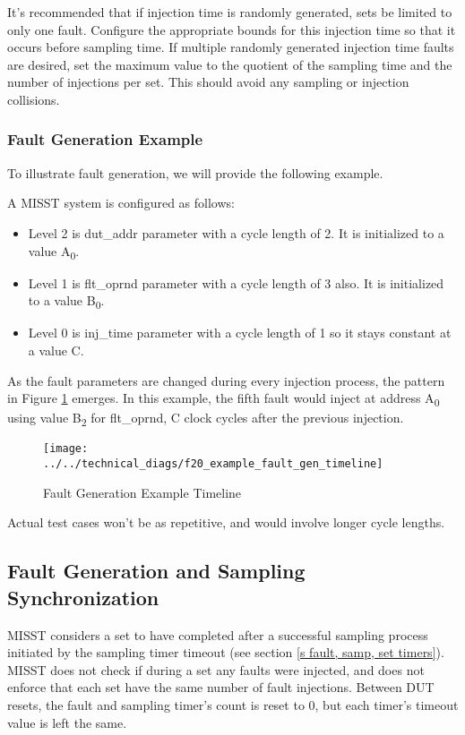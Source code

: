 \documentclass[]{report}
\begin{document}
It's recommended that if injection time is randomly generated, sets be limited to only one fault. Configure the appropriate bounds for this injection time so that it occurs before sampling time. If multiple randomly generated injection time faults are desired, set the maximum value to the quotient of the sampling time and the number of injections per set. This should avoid any sampling or injection collisions.

\subsubsection{Fault Generation Example}
\label{ss fault gen example}

To illustrate fault generation, we will provide the following example.

A MISST system is configured as follows:
\begin{itemize}
	\item Level 2 is dut\_addr parameter with a cycle length of 2. It is initialized to a value A\textsubscript{0}.
	\item Level 1 is flt\_oprnd parameter with a cycle length of 3 also. It is initialized to a value B\textsubscript{0}.
	\item Level 0 is inj\_time parameter with a cycle length of 1 so it stays constant at a value C.
\end{itemize}

As the fault parameters are changed during every injection process, the pattern in Figure \ref{fig:example fault gen timeline} emerges. In this example, the fifth fault would inject at address A\textsubscript{0} using value B\textsubscript{2} for flt\_oprnd, C clock cycles after the previous injection.  

\begin{figure}[h]
	\centering
	\texttt{[image: ../../technical\_diags/f20\_example\_fault\_gen\_timeline]}
	\caption{Fault Generation Example Timeline}
	\label{fig:example fault gen timeline}
\end{figure}

Actual test cases won't be as repetitive, and would involve longer cycle lengths. 

\subsection{Fault Generation and Sampling Synchronization}

MISST considers a set to have completed after a successful sampling process initiated by the sampling timer timeout (see section \ref{s fault, samp, set timers}). MISST does not check if during a set any faults were injected, and does not enforce that each set have the same number of fault injections. Between DUT resets, the fault and sampling timer's count is reset to 0, but each timer's timeout value is left the same.
\end{document}
